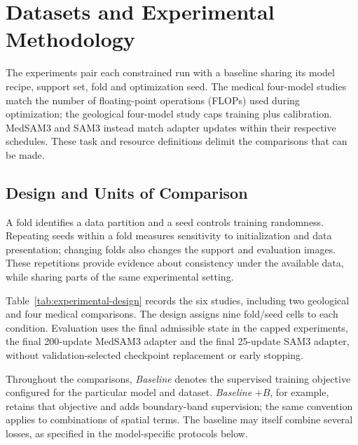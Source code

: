 \documentclass[12pt,a4paper]{article}
\begin{document}
\clearpage
\section{Datasets and Experimental Methodology}
\label{sec:methodology}

The experiments pair each constrained run with a baseline sharing its
model recipe, support set, fold and optimization seed. The medical
four-model studies match the number of floating-point operations (FLOPs)
used during optimization; the geological four-model
study caps training plus calibration. MedSAM3 and SAM3 instead match
adapter updates within their respective schedules. These task and
resource definitions delimit the comparisons that can be made.

\subsection{Design and Units of Comparison}
\label{sec:experimental-structure}

A fold identifies a data partition and a seed controls training
randomness. Repeating seeds within a fold measures sensitivity to
initialization and data presentation; changing folds also changes the
support and evaluation images. These repetitions provide evidence about
consistency under the available data, while sharing parts of the same
experimental setting.

Table~\ref{tab:experimental-design} records the six studies, including
two geological and four medical comparisons. The design assigns nine fold/seed cells
to each condition. Evaluation uses the final admissible state in the
capped experiments, the final 200-update MedSAM3 adapter and the final
25-update SAM3 adapter, without validation-selected checkpoint
replacement or early stopping.

Throughout the comparisons, \emph{Baseline} denotes the supervised
training objective configured for the particular model and dataset.
\emph{Baseline} $+B$, for example, retains that objective and adds
boundary-band supervision; the same convention applies to combinations
of spatial terms. The baseline may itself combine several losses, as
specified in the model-specific protocols below.
\end{document}
